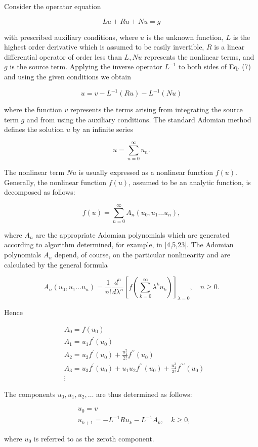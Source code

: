 Consider the operator equation


\begin{equation*}
L u+R u+N u=g \tag{7}
\end{equation*}


with prescribed auxiliary conditions, where $u$ is the unknown function, $L$ is the highest order derivative which is assumed to be easily invertible, $R$ is a linear differential operator of order less than $L, N u$ represents the nonlinear terms, and $g$ is the source term. Applying the inverse operator $L^{-1}$ to both sides of Eq. (7) and using the given conditions we obtain

$$
u=v-L^{-1}(R u)-L^{-1}(N u)
$$

where the function $v$ represents the terms arising from integrating the source term $g$ and from using the auxiliary conditions. The standard Adomian method defines the solution $u$ by an infinite series

$$
u=\sum_{n=0}^{\infty} u_{n} .
$$

The nonlinear term $N u$ is usually expressed as a nonlinear function $f(u)$. Generally, the nonlinear function $f(u)$, assumed to be an analytic function, is decomposed as follows:

$$
f(u)=\sum_{n=0}^{\infty} A_{n}\left(u_{0}, u_{1} \ldots u_{n}\right),
$$

where $A_{n}$ are the appropriate Adomian polynomials which are generated according to algorithm determined, for example, in [4,5,23]. The Adomian polynomials $A_{n}$ depend, of course, on the particular nonlinearity and are calculated by the general formula


\begin{equation*}
A_{n}\left(u_{0}, u_{1} \ldots u_{n}\right)=\frac{1}{n!} \frac{d^{n}}{d \lambda^{n}}\left[f\left(\sum_{k=0}^{\infty} \lambda^{k} u_{k}\right)\right]_{\lambda=0}, \quad n \geq 0 . \tag{8}
\end{equation*}

Hence

$$
\begin{aligned}
& A_{0}=f\left(u_{0}\right) \\
& A_{1}=u_{1} f^{\prime}\left(u_{0}\right) \\
& A_{2}=u_{2} f^{\prime}\left(u_{0}\right)+\frac{u_{1}^{2}}{2!} f^{\prime \prime}\left(u_{0}\right) \\
& A_{3}=u_{3} f^{\prime}\left(u_{0}\right)+u_{1} u_{2} f^{\prime \prime}\left(u_{0}\right)+\frac{u_{1}^{3}}{3!} f^{\prime \prime \prime}\left(u_{0}\right) \\
& \vdots
\end{aligned}
$$

The components $u_{0}, u_{1}, u_{2}, \ldots$ are thus determined as follows:

$$
\begin{aligned}
& u_{0}=v \\
& u_{k+1}=-L^{-1} R u_{k}-L^{-1} A_{k}, \quad k \geq 0,
\end{aligned}
$$

where $u_{0}$ is referred to as the zeroth component.
